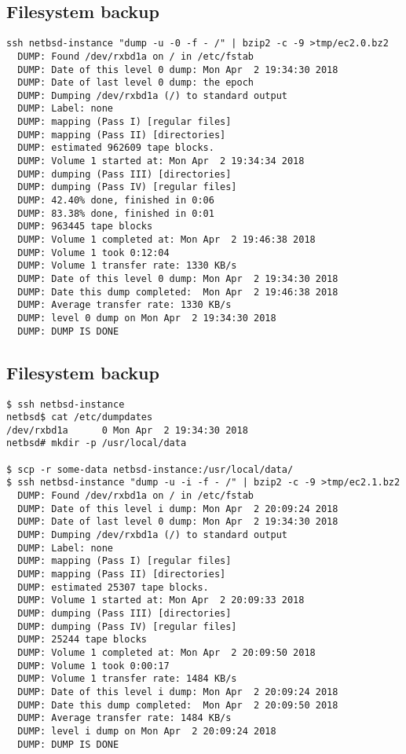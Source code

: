 \documentclass[xga]{xdvislides}
\begin{document}
\subsection{Filesystem backup}
\smallish
\begin{verbatim}
ssh netbsd-instance "dump -u -0 -f - /" | bzip2 -c -9 >tmp/ec2.0.bz2
  DUMP: Found /dev/rxbd1a on / in /etc/fstab
  DUMP: Date of this level 0 dump: Mon Apr  2 19:34:30 2018
  DUMP: Date of last level 0 dump: the epoch
  DUMP: Dumping /dev/rxbd1a (/) to standard output
  DUMP: Label: none
  DUMP: mapping (Pass I) [regular files]
  DUMP: mapping (Pass II) [directories]
  DUMP: estimated 962609 tape blocks.
  DUMP: Volume 1 started at: Mon Apr  2 19:34:34 2018
  DUMP: dumping (Pass III) [directories]
  DUMP: dumping (Pass IV) [regular files]
  DUMP: 42.40% done, finished in 0:06
  DUMP: 83.38% done, finished in 0:01
  DUMP: 963445 tape blocks
  DUMP: Volume 1 completed at: Mon Apr  2 19:46:38 2018
  DUMP: Volume 1 took 0:12:04
  DUMP: Volume 1 transfer rate: 1330 KB/s
  DUMP: Date of this level 0 dump: Mon Apr  2 19:34:30 2018
  DUMP: Date this dump completed:  Mon Apr  2 19:46:38 2018
  DUMP: Average transfer rate: 1330 KB/s
  DUMP: level 0 dump on Mon Apr  2 19:34:30 2018
  DUMP: DUMP IS DONE
\end{verbatim}
\Normalsize


\subsection{Filesystem backup}
\smallish
\begin{verbatim}
$ ssh netbsd-instance
netbsd$ cat /etc/dumpdates
/dev/rxbd1a      0 Mon Apr  2 19:34:30 2018
netbsd# mkdir -p /usr/local/data

$ scp -r some-data netbsd-instance:/usr/local/data/
$ ssh netbsd-instance "dump -u -i -f - /" | bzip2 -c -9 >tmp/ec2.1.bz2
  DUMP: Found /dev/rxbd1a on / in /etc/fstab
  DUMP: Date of this level i dump: Mon Apr  2 20:09:24 2018
  DUMP: Date of last level 0 dump: Mon Apr  2 19:34:30 2018
  DUMP: Dumping /dev/rxbd1a (/) to standard output
  DUMP: Label: none
  DUMP: mapping (Pass I) [regular files]
  DUMP: mapping (Pass II) [directories]
  DUMP: estimated 25307 tape blocks.
  DUMP: Volume 1 started at: Mon Apr  2 20:09:33 2018
  DUMP: dumping (Pass III) [directories]
  DUMP: dumping (Pass IV) [regular files]
  DUMP: 25244 tape blocks
  DUMP: Volume 1 completed at: Mon Apr  2 20:09:50 2018
  DUMP: Volume 1 took 0:00:17
  DUMP: Volume 1 transfer rate: 1484 KB/s
  DUMP: Date of this level i dump: Mon Apr  2 20:09:24 2018
  DUMP: Date this dump completed:  Mon Apr  2 20:09:50 2018
  DUMP: Average transfer rate: 1484 KB/s
  DUMP: level i dump on Mon Apr  2 20:09:24 2018
  DUMP: DUMP IS DONE
\end{verbatim}
\Normalsize
\end{document}
